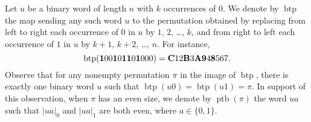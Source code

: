 \documentclass[a4paper]{llncs}
\DeclareMathOperator{\BINTOPERM}{\mathrm{btp}}
\DeclareMathOperator{\PERMTOBIN}{\mathrm{ptb}}
\begin{document}
Let $u$ be a binary word of length $n$ with $k$ occurrences of $0$.
We denote by $\BINTOPERM$ the map sending any such word $u$ to the
permutation obtained by replacing from left to right each occurrence of
$0$ in $u$ by $1$, $2$, \dots, $k$, and from right to left each
occurrence of $1$ in $u$ by $k + 1$, $k + 2$, \dots, $n$. For instance,
\begin{equation}
    \BINTOPERM({\bf 1}00{\bf 1}0{\bf 1}{\bf 1}0{\bf 1}000) =
    {\bf C} 12 {\bf B} 3 {\bf A} {\bf 9} 4 {\bf 8} 567.
\end{equation}
Observe that for any nonempty permutation $\pi$ in the image of
$\BINTOPERM$, there is exactly one binary word $u$ such that
$\BINTOPERM(u0) = \BINTOPERM(u1) = \pi$. In support of this observation,
when $\pi$ has an even size, we denote by $\PERMTOBIN(\pi)$ the word $ua$
such that $|ua|_0$ and $|ua|_1$ are both even, where $a \in \{0, 1\}$.
\medskip
\end{document}
